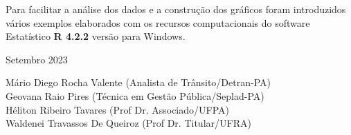 Para facilitar a análise dos dados e a construção dos gráficos foram introduzidos vários exemplos elaborados com os recursos computacionais do software Estatístico \textbf{R 4.2.2} versão para Windows. 
\vst


\vst

\begin{centering}

\vst

Setembro 2023 
\vsm

Mário Diego Rocha Valente (Analista de Trânsito/Detran-PA) \\

Geovana Raio Pires (Técnica em Gestão Pública/Seplad-PA)\\

Héliton Ribeiro Tavares (Prof Dr. Associado/UFPA)\\

Waldenei Travassos De Queiroz (Prof Dr. Titular/UFRA)\\



\end{centering}
